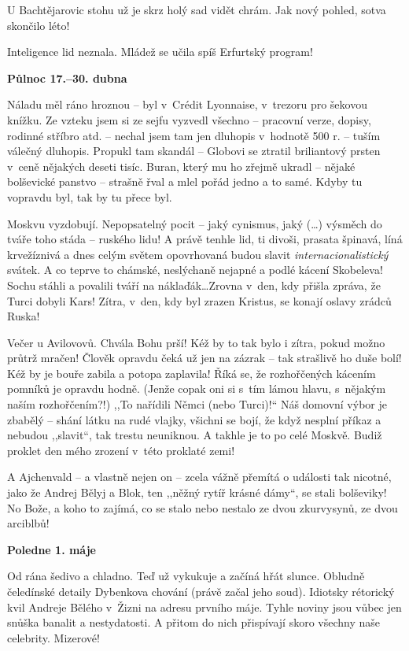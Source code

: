  U Bachtějarovic stohu už je skrz holý sad vidět chrám. Jak nový pohled, sotva skončilo léto!

Inteligence lid neznala. Mládež se učila spíš Erfurtský program!

\pagebreak

\noindent
\textbf{Půlnoc 17.--30. dubna} 

\noindent
Náladu měl ráno hroznou -- byl v Crédit Lyonnaise, v trezoru pro šekovou knížku. Ze vzteku jsem si ze sejfu vyzvedl všechno -- pracovní verze, dopisy, rodinné stříbro atd. -- nechal jsem tam jen dluhopis v hodnotě 500 r. -- tuším válečný dluhopis. Propukl tam skandál -- Globovi se ztratil briliantový prsten v ceně nějakých deseti tisíc. Buran, který mu ho zřejmě ukradl -- nějaké bolševické panstvo -- strašně řval a mlel pořád jedno a to samé. Kdyby tu vopravdu byl, tak by tu přece byl.

Moskvu vyzdobují. Nepopsatelný pocit -- jaký cynismus, jaký (\ldots) výsměch do tváře toho stáda -- ruského lidu! A právě ten\-hle lid, ti divoši, prasata špinavá, líná krvežíznivá a dnes celým světem opovrhovaná budou slavit  \textit{internacionalistický} svátek. A co teprve to chámské, neslýchaně nejapné a podlé kácení Skobeleva! Sochu stáhli a povalili tváří na náklaďák\ldots Zrovna v den, kdy přišla zpráva, že Turci dobyli Kars! Zítra, v den, kdy byl zrazen Kristus, se konají oslavy zrádců Ruska!

Večer u Avilovovů. Chvála Bohu prší! Kéž by to tak bylo i zítra, pokud možno průtrž mračen! Člověk opravdu čeká už jen na zázrak -- tak strašlivě ho duše bolí! Kéž by je bouře zabila a potopa zaplavila! Říká se, že rozhořčených kácením pomníků je opravdu hodně. (Jenže copak oni si s tím lámou hlavu, s nějakým naším rozhořčením?!) ,,To nařídili Němci (nebo Turci)!`` Náš domovní výbor je zbabělý -- shání látku na rudé vlajky, všichni se bojí, že když nesplní příkaz a nebudou ,,slavit``, tak trestu neuniknou. A takhle je to po celé Moskvě. Budiž proklet den mého zrození v této proklaté zemi!

A Ajchenvald -- a vlastně nejen on -- zcela vážně přemítá o události tak nicotné, jako že Andrej Bělyj a Blok, ten ,,něžný rytíř krásné dámy``, se stali bolševiky! No Bože, a koho to zajímá, co se stalo nebo nestalo ze dvou zkurvysynů, ze dvou arciblbů! 

\medskip

\noindent
\textbf{Poledne 1. máje} 

\noindent
Od rána šedivo a chladno. Teď už vykukuje a začíná hřát slunce. Obludně čeledínské detaily Dybenkova chování (právě začal jeho soud). Idiotsky rétorický kvil Andreje Bělého v Žizni na adresu prvního máje. Tyhle noviny jsou vůbec jen snůška banalit a nestydatosti. A přitom do nich přispívají skoro všechny naše celebrity. Mizerové!


